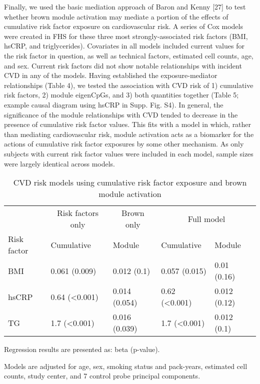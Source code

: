 \documentclass[]{bmcart}
\theoremstyle{definition}
\theoremstyle{definition}
\theoremstyle{definition}
\theoremstyle{remark}
\begin{document}
Finally, we used the basic mediation approach of Baron and Kenny
{[}27{]} to test whether brown module activation may mediate a portion
of the effects of cumulative risk factor exposure on cardiovascular
risk. A series of Cox models were created in FHS for these three most
strongly-associated risk factors (BMI, hsCRP, and triglycerides).
Covariates in all models included current values for the risk factor in
question, as well as technical factors, estimated cell counts, age, and
sex. Current risk factors did not show notable relationships with
incident CVD in any of the models. Having established the
exposure-mediator relationships (Table 4), we tested the association
with CVD risk of 1) cumulative risk factors, 2) module eigenCpGs, and 3)
both quantities together (Table 5; example causal diagram using hsCRP in
Supp. Fig. S4). In general, the significance of the module relationships
with CVD tended to decrease in the presence of cumulative risk factor
values. This fits with a model in which, rather than mediating
cardiovascular risk, module activation acts as a biomarker for the
actions of cumulative risk factor exposures by some other mechanism. As
only subjects with current risk factor values were included in each
model, sample sizes were largely identical across models.

\begin{table}

\caption{\label{tab:module-mediation}CVD risk models using cumulative risk factor exposure and brown module activation}
\centering
\begin{threeparttable}
\begin{tabular}[t]{lllll}
\toprule
\multicolumn{1}{c}{} & \multicolumn{1}{c}{Risk factors only} & \multicolumn{1}{c}{Brown only} & \multicolumn{2}{c}{Full model} \\
\cmidrule(l{2pt}r{2pt}){2-2} \cmidrule(l{2pt}r{2pt}){3-3} \cmidrule(l{2pt}r{2pt}){4-5}
Risk factor & Cumulative & Module & Cumulative & Module\\
\midrule
BMI & 0.061 (0.009) & 0.012 (0.1) & 0.057 (0.015) & 0.01 (0.16)\\
hsCRP & 0.64 (<0.001) & 0.014 (0.054) & 0.62 (<0.001) & 0.012 (0.12)\\
TG & 1.7 (<0.001) & 0.016 (0.039) & 1.7 (<0.001) & 0.012 (0.1)\\
\bottomrule
\end{tabular}
\begin{tablenotes}
\item * Regression results are presented as: beta (p-value).
\item * Models are adjusted for age, sex, smoking status and pack-years, estimated cell counts, study center, and 7 control probe principal components.
\end{tablenotes}
\end{threeparttable}
\end{table}
\end{document}
